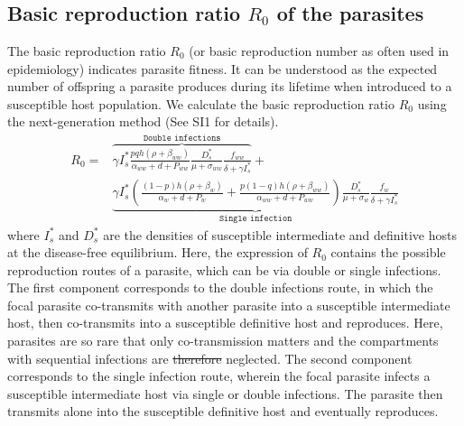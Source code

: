 \documentclass[a4paper]{scrartcl}
\providecommand{\DIFaddtex}[1]{{\protect\color{blue}\uwave{#1}}} %
\providecommand{\DIFdeltex}[1]{{\protect\color{red}\sout{#1}}}                      %
\providecommand{\DIFaddend}{} %
\providecommand{\DIFdelbegin}{} %
\providecommand{\DIFdelend}{} %
\providecommand{\DIFadd}[1]{\texorpdfstring{\DIFaddtex{#1}}{#1}} %
\providecommand{\DIFdel}[1]{\texorpdfstring{\DIFdeltex{#1}}{}} %
\newcommand{\DIFscaledelfig}{0.5}
\newlength{\DIFdelgraphicswidth} %
\newlength{\DIFdelgraphicsheight} %
\newcommand{\DIFdelincludegraphics}[2][]{%
\sbox{\DIFdelgraphicsbox}{\DIFOincludegraphics[#1]{#2}}%
\settoboxwidth{\DIFdelgraphicswidth}{\DIFdelgraphicsbox} %
\settoboxtotalheight{\DIFdelgraphicsheight}{\DIFdelgraphicsbox} %
\scalebox{\DIFscaledelfig}{%
\parbox[b]{\DIFdelgraphicswidth}{\usebox{\DIFdelgraphicsbox}\\[-\baselineskip] \rule{\DIFdelgraphicswidth}{0em}}\llap{\resizebox{\DIFdelgraphicswidth}{\DIFdelgraphicsheight}{%
\setlength{\unitlength}{\DIFdelgraphicswidth}%
\begin{picture}(1,1)%
\thicklines\linethickness{2pt} %
{\color[rgb]{1,0,0}\put(0,0){\framebox(1,1){}}}%
{\color[rgb]{1,0,0}\put(0,0){\line( 1,1){1}}}%
{\color[rgb]{1,0,0}\put(0,1){\line(1,-1){1}}}%
\end{picture}%
}\hspace*{3pt}}} %
} %
\DeclareRobustCommand{\DIFaddend}{\DIFOaddend \let\includegraphics\DIFOincludegraphics} %
\DeclareRobustCommand{\DIFdelbegin}{\DIFOdelbegin \let\includegraphics\DIFdelincludegraphics} %
\DeclareRobustCommand{\DIFdelend}{\DIFOaddend \let\includegraphics\DIFOincludegraphics} %
\begin{document}
\section*{\DIFadd{Results}}
\DIFaddend \subsection*{Basic reproduction ratio $R_0$ of the parasites}

The basic reproduction ratio $R_0$ (or basic reproduction number as often used in epidemiology) indicates parasite fitness. 
It can be understood as the expected number of offspring a parasite produces during its lifetime when introduced to a susceptible host population. 
We calculate the basic reproduction ratio $R_0$ using the next-generation method \citep{Diekmann1990, Diekmann2009, hurford:JRSI:2010} (See SI1 for details).
%
\begin{align}
R_0 = & \overbrace{\gamma I_s^* \frac{p q h (\rho +  \beta_{ww})}{\alpha_{ww} + d + P_{ww}} \frac{D_s^*}{\mu +\sigma_{ww}} \frac{f_{ww}}{\delta +\gamma I_s^*}}^{ \texttt{Double infections}} + \nonumber \\
& \underbrace{\gamma  I_s^* \left( \frac{ (1-p) h (\rho + \beta_w)}{\alpha_w + d + P_w} + \frac{p (1-q) h (\rho + \beta_{ww})}{\alpha_{ww} + d + P_{ww}} \right) \frac{D_s^*}{\mu + \sigma_w} \frac{f_w}{\delta +\gamma  I_s^*}}_{\texttt{Single infection}}
\end{align}
%
where $I_s^*$ and $D_s^*$ are the densities of susceptible intermediate and definitive hosts at the disease-free equilibrium. 
Here, the expression of $R_0$ contains the possible reproduction routes of a parasite, which can be via double or single infections. 
The first component corresponds to the double infections route, in which the focal parasite co-transmits with another parasite into a susceptible intermediate host, then co-transmits into a susceptible definitive host and reproduces. 
Here, parasites are so rare that only co-transmission matters and the compartments with sequential infections are \DIFdelbegin \DIFdel{therefore }\DIFdelend neglected. 
The second component corresponds to the single infection route, wherein the focal parasite infects a susceptible intermediate host via single or double infections. 
The parasite then transmits alone into the susceptible definitive host and eventually reproduces. 
\end{document}
